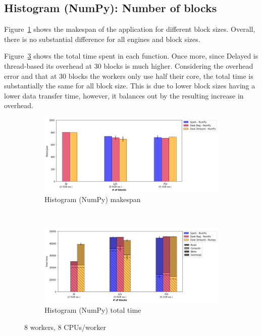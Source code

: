 \documentclass[conference]{IEEEtran}
\begin{document}
\subsection{Histogram (NumPy): Number of blocks}
Figure~\ref{fig:histo_np_ms_block} shows the makespan of the application for
different block sizes. Overall, there is no substantial difference for
all engines and block sizes.

Figure~\ref{fig:histo_np_tt_block} shows the total time spent in each function.
Once more, since Delayed is thread-based its overhead at 30 blocks is much
higher. Considering the overhead error and that at 30 blocks
the workers only use half their core, the total time is substantially the same
for all block size. This is due to lower block sizes having a lower data transfer time,
however, it balances out by the resulting increase in overhead.

\begin{figure}[!t]
    \centering
    \begin{subfigure}[b]{\columnwidth}
        \includegraphics[clip,width=\columnwidth]{images/histo_np_block.png}%
        \caption{Histogram (NumPy) makespan}\label{fig:histo_np_ms_block}
    \end{subfigure}
    \\
    \begin{subfigure}[b]{\columnwidth}
        \includegraphics[clip,width=\columnwidth]{images/histo_idle_np_block.png}%
        \caption{Histogram (NumPy) total time}\label{fig:histo_np_tt_block}
    \end{subfigure}
    \caption{8 workers, 8 CPUs/worker}
\end{figure}
\end{document}
